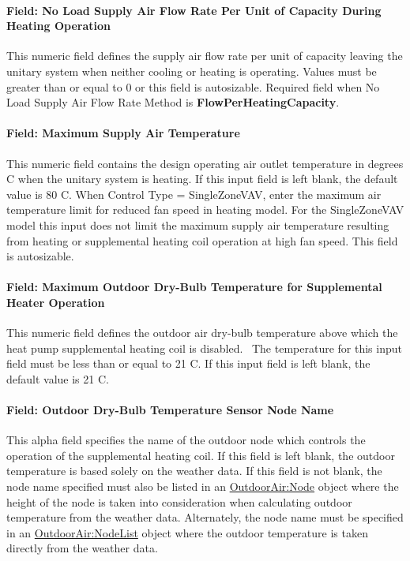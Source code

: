 \paragraph{Field: No Load Supply Air Flow Rate Per Unit of Capacity During Heating Operation}\label{field-no-load-supply-air-flow-rate-per-unit-of-capacity-during-heating-operation}

This numeric field defines the supply air flow rate per unit of capacity leaving the unitary system when neither cooling or heating is operating. Values must be greater than or equal to 0 or this field is autosizable. Required field when No Load Supply Air Flow Rate Method is \textbf{FlowPerHeatingCapacity}.

\paragraph{Field: Maximum Supply Air Temperature}\label{field-maximum-supply-air-temperature-000}

This numeric field contains the design operating air outlet temperature in degrees C when the unitary system is heating. If this input field is left blank, the default value is 80 C. When Control Type = SingleZoneVAV, enter the maximum air temperature limit for reduced fan speed in heating model. For the SingleZoneVAV model this input does not limit the maximum supply air temperature resulting from heating or supplemental heating coil operation at high fan speed.  This field is autosizable.


\paragraph{Field: Maximum Outdoor Dry-Bulb Temperature for Supplemental Heater Operation}\label{field-maximum-outdoor-dry-bulb-temperature-for-supplemental-heater-operation}

This numeric field defines the outdoor air dry-bulb temperature above which the heat pump supplemental heating coil is disabled.~ The temperature for this input field must be less than or equal to 21 C. If this input field is left blank, the default value is 21 C.

\paragraph{Field: Outdoor Dry-Bulb Temperature Sensor Node Name}\label{field-outdoor-dry-bulb-temperature-sensor-node-name}

This alpha field specifies the name of the outdoor node which controls the operation of the supplemental heating coil. If this field is left blank, the outdoor temperature is based solely on the weather data. If this field is not blank, the node name specified must also be listed in an \hyperref[outdoorairnode]{OutdoorAir:Node} object where the height of the node is taken into consideration when calculating outdoor temperature from the weather data. Alternately, the node name must be specified in an \hyperref[outdoorairnodelist]{OutdoorAir:NodeList} object where the outdoor temperature is taken directly from the weather data.

